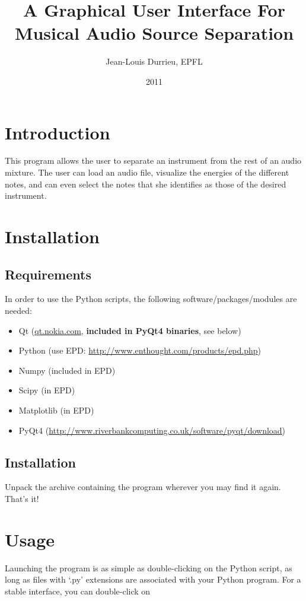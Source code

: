 \documentclass{article}
\title{A Graphical User Interface For Musical Audio Source Separation}
\author{Jean-Louis Durrieu, EPFL}
\date{2011}
\begin{document}
\maketitle

\section{Introduction}

This program allows the user to separate an instrument from the rest of an audio mixture. The user can load an audio file, visualize the energies of the different notes, and can even select the notes that she identifies as those of the desired instrument. 

\section{Installation}

\subsection{Requirements}
In order to use the Python scripts, the following software/packages/modules are needed:

\begin{itemize}
\item Qt            (\url{qt.nokia.com}, \textbf{included in PyQt4 binaries}, see below)
\item Python        (use EPD: \url{http://www.enthought.com/products/epd.php})
\item Numpy         (included in EPD)
\item Scipy         (in EPD)
\item Matplotlib    (in EPD)
\item PyQt4         (\url{http://www.riverbankcomputing.co.uk/software/pyqt/download})
\end{itemize}

\subsection{Installation}
Unpack the archive containing the program wherever you may find it again. That's it!

\section{Usage}

Launching the program is as simple as double-clicking on the Python script, as long as files with `.py' extensions are associated with your Python program. For a stable interface, you can double-click on 
\end{document}
